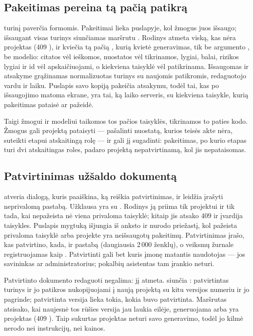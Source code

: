 \subsection{Pakeitimas pereina tą pačią patikrą}

 turinį paverčia formomis. Pakeitimai lieka puslapyje, kol žmogus juos išsaugo;
išsaugant visas turinys siunčiamas maršrutu . Rodinys
 atmeta viską, kas nėra projektas (409 ), ir kviečia tą
pačią , kurią kvietė generavimas, tik be argumento , \ie be modelio:
citatos vėl ieškomos, nuostatos vėl tikrinamos, lygiai, balai, rizikos lygiai ir id vėl
apskaičiuojami, o kiekviena taisyklė vėl patikrinama. Išsaugomas ir atsakyme grąžinamas
normalizuotas turinys su naujomis patikromis, redaguotojo vardu ir laiku. Puslapis savo kopiją
pakeičia atsakymu, todėl tai, kas po išsaugojimo matoma ekrane, yra tai, ką laiko serveris, su
kiekviena taisykle, kurią pakeitimas pataisė ar pažeidė.

Taigi žmogui ir modeliui taikomos tos pačios taisyklės, tikrinamos to paties kodo. Žmogus gali
projektą pataisyti --- pašalinti nuostatą, kurios teisės akte nėra, suteikti etapui atskaitingą
rolę --- ir gali jį sugadinti: pakeitimas, po kurio etapas turi dvi atskaitingas roles,
padaro projektą nepatvirtinamą, kol jis nepataisomas.

\subsection{Patvirtinimas užšaldo dokumentą}

 atveria dialogą, kuris paaiškina, ką reiškia patvirtinimas, ir leidžia
įrašyti neprivalomą pastabą. Užklausa yra
 su . Rodinys  ją
priima tik projektui ir tik tada, kai nepažeista nė viena privaloma taisyklė; kitaip jis atsako
409  ir įvardija taisykles. Puslapis mygtuką išjungia iš anksto ir nurodo
priežastį, kol pažeista privaloma taisyklė arba projekte yra neišsaugotų pakeitimų.
Patvirtinimas įrašo, kas patvirtino, kada, ir pastabą (daugiausia 2\,000 ženklų), o veiksmų
žurnale registruojamas kaip . Patvirtinti gali bet kuris įmonę matantis
naudotojas --- jos savininkas ar administratorius; pokalbių asistentas tam įrankio neturi.

Patvirtinto dokumento redaguoti negalima:  jį atmeta.  siunčia
: patvirtintas turinys ir jo patikros nukopijuojami į
naują projektą su kitu versijos numeriu ir  jo pagrinde; patvirtinta versija
lieka tokia, kokia buvo patvirtinta. Maršrutas atsisako, kai naujesnė tos rūšies versija jau
laukia eilėje, generuojama arba yra projektas (409 ). Taip sukurtas
projektas neturi savo generavimo, todėl jo kilmė nerodo nei instrukcijų, nei kainos.

